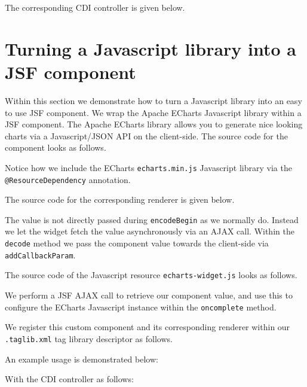 The corresponding CDI controller is given below.



\section{Turning a Javascript library into a JSF component}
Within this section we demonstrate how to turn a Javascript library into an easy to use JSF component.
We wrap the Apache ECharts \cite{ECharts} Javascript library within a JSF component.
The Apache ECharts library allows you to generate nice looking charts via a Javascript/JSON API on the client-side.
The source code for the component looks as follows.

Notice how we include the ECharts \texttt{echarts.min.js} Javascript library via the \texttt{@Resource\allowbreak Dependency} annotation.

The source code for the corresponding renderer is given below.

The value is not directly passed during \texttt{encodeBegin} as we normally do.
Instead we let the widget fetch the value asynchronously via an AJAX call.
Within the \texttt{decode} method we pass the component value towards the client-side via \texttt{addCallbackParam}.

The source code of the Javascript resource \texttt{echarts-widget.js} looks as follows.

We perform a JSF AJAX call to retrieve our component value, and use this to configure the ECharts Javascript instance within the \texttt{oncomplete} method.

We register this custom component and its corresponding renderer within our \texttt{.taglib\allowbreak .xml} tag library descriptor as follows.


An example usage is demonstrated below:


With the CDI controller as follows:


